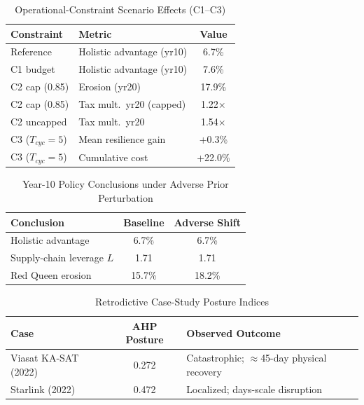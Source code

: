 \begin{table}[H]
\centering
\caption{Operational-Constraint Scenario Effects (C1--C3)}
\label{tab:constraints_live}
\scriptsize
\renewcommand{\arraystretch}{1.15}
\begin{tabular}{llc}
\toprule
\textbf{Constraint} & \textbf{Metric} & \textbf{Value} \\
\midrule
Reference & Holistic advantage (yr10) & 6.7\% \\
C1 budget & Holistic advantage (yr10) & 7.6\% \\
C2 cap (0.85) & Erosion (yr20) & 17.9\% \\
C2 cap (0.85) & Tax mult.\ yr20 (capped) & 1.22$\times$ \\
C2 uncapped & Tax mult.\ yr20 & 1.54$\times$ \\
C3 ($T_{cyc}{=}5$) & Mean resilience gain & +0.3\% \\
C3 ($T_{cyc}{=}5$) & Cumulative cost & +22.0\% \\
\bottomrule
\end{tabular}
\end{table}

\begin{table}[H]
\centering
\caption{Year-10 Policy Conclusions under Adverse Prior Perturbation}
\label{tab:perturbation_live}
\scriptsize
\renewcommand{\arraystretch}{1.15}
\begin{tabular}{lcc}
\toprule
\textbf{Conclusion} & \textbf{Baseline} & \textbf{Adverse Shift} \\
\midrule
Holistic advantage & 6.7\% & 6.7\% \\
Supply-chain leverage $L$ & 1.71 & 1.71 \\
Red Queen erosion & 15.7\% & 18.2\% \\
\bottomrule
\end{tabular}
\end{table}

\begin{table}[H]
\centering
\caption{Retrodictive Case-Study Posture Indices}
\label{tab:cases_live}
\scriptsize
\renewcommand{\arraystretch}{1.15}
\begin{tabular}{lcp{3.4cm}}
\toprule
\textbf{Case} & \textbf{AHP Posture} & \textbf{Observed Outcome} \\
\midrule
Viasat KA-SAT (2022) & 0.272 & Catastrophic; $\approx$45-day physical recovery \\
Starlink (2022) & 0.472 & Localized; days-scale disruption \\
\bottomrule
\end{tabular}
\end{table}

